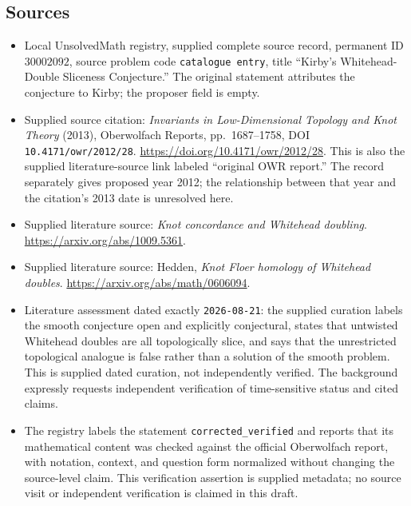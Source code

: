 \documentclass[11pt]{article}
\begin{document}
\subsection{Sources}
\begin{itemize}
\item Local UnsolvedMath registry, supplied complete source record, permanent ID \(30002092\), source problem code \texttt{catalogue entry}, title ``Kirby's Whitehead-Double Sliceness Conjecture.'' The original statement attributes the conjecture to Kirby; the proposer field is empty.
\item Supplied source citation: \emph{Invariants in Low-Dimensional Topology and Knot Theory} (2013), Oberwolfach Reports, pp.\ 1687--1758, DOI \texttt{10.4171/owr/2012/28}. \url{https://doi.org/10.4171/owr/2012/28}. This is also the supplied literature-source link labeled ``original OWR report.'' The record separately gives proposed year 2012; the relationship between that year and the citation's 2013 date is unresolved here.
\item Supplied literature source: \emph{Knot concordance and Whitehead doubling}. \url{https://arxiv.org/abs/1009.5361}.
\item Supplied literature source: Hedden, \emph{Knot Floer homology of Whitehead doubles}. \url{https://arxiv.org/abs/math/0606094}.
\item Literature assessment dated exactly \texttt{2026-08-21}: the supplied curation labels the smooth conjecture open and explicitly conjectural, states that untwisted Whitehead doubles are all topologically slice, and says that the unrestricted topological analogue is false rather than a solution of the smooth problem. This is supplied dated curation, not independently verified. The background expressly requests independent verification of time-sensitive status and cited claims.
\item The registry labels the statement \texttt{corrected\_verified} and reports that its mathematical content was checked against the official Oberwolfach report, with notation, context, and question form normalized without changing the source-level claim. This verification assertion is supplied metadata; no source visit or independent verification is claimed in this draft.
\end{itemize}
\end{document}
